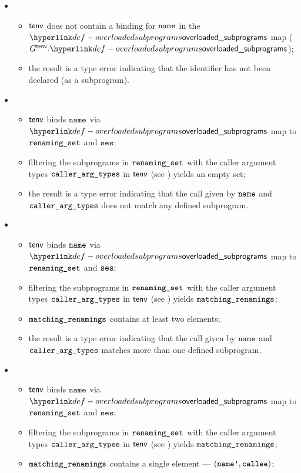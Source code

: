 \ProseParagraph
\OneApplies
\begin{itemize}
  \item {}
  \begin{itemize}
    \item $\textsf{tenv}$ does not contain a binding for $\texttt{name}$ in the $\overloadedsubprograms$ map
          ($G^\tenv.\overloadedsubprograms$);
    \item the result is a type error indicating that the identifier has not been declared (as a subprogram).
  \end{itemize}

  \item {}
  \begin{itemize}
    \item $\textsf{tenv}$ binds $\texttt{name}$ via $\overloadedsubprograms$ map to $\texttt{renaming\_set}$ and $\texttt{ses}$;
    \item filtering the subprograms in $\texttt{renaming\_set}$ with the caller argument types $\texttt{caller\_arg\_types}$
          in $\textsf{tenv}$ (see ) yields an empty set\ProseOrTypeError;
    \item the result is a type error indicating that the call given by $\texttt{name}$ and \\ $\texttt{caller\_arg\_types}$
          does not match any defined subprogram.
  \end{itemize}

  \item {}
  \begin{itemize}
    \item $\textsf{tenv}$ binds $\texttt{name}$ via $\overloadedsubprograms$ map to $\texttt{renaming\_set}$ and $\texttt{ses}$;
    \item filtering the subprograms in $\texttt{renaming\_set}$ with the caller argument types $\texttt{caller\_arg\_types}$
          in $\textsf{tenv}$ (see ) yields $\texttt{matching\_renamings}$\ProseOrTypeError;
    \item $\texttt{matching\_renamings}$ contains at least two elements;
    \item the result is a type error indicating that the call given by $\texttt{name}$ and \\
          $\texttt{caller\_arg\_types}$ matches more than one defined subprogram.
  \end{itemize}

  \item {}
  \begin{itemize}
    \item $\textsf{tenv}$ binds $\texttt{name}$ via $\overloadedsubprograms$ map to $\texttt{renaming\_set}$ and $\texttt{ses}$;
    \item filtering the subprograms in $\texttt{renaming\_set}$ with the caller argument types $\texttt{caller\_arg\_types}$
          in $\textsf{tenv}$ (see ) yields $\texttt{matching\_renamings}$\ProseOrTypeError;
    \item $\texttt{matching\_renamings}$ contains a single element --- $(\texttt{name'}, \texttt{callee})$\ProseOrTypeError;
  \end{itemize}
\end{itemize}

